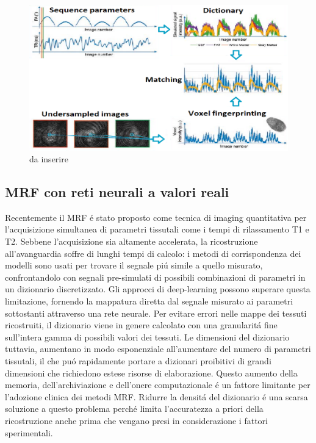 \documentclass[a4paper,10pt]{article}
\begin{document}
 \begin{figure}[h!]
  \centering
  \includegraphics[scale=0.3]{MRF.png}
  \caption{da inserire}
  \label{MRFpng}
 \end{figure}

 \subsection{MRF con reti neurali a valori reali}
 
 Recentemente il MRF \'e stato proposto come tecnica di imaging quantitativa per l'acquisizione simultanea di parametri tissutali come i tempi di rilassamento T1 e T2. Sebbene l'acquisizione sia altamente accelerata, la ricostruzione all'avanguardia soffre di lunghi tempi di calcolo: i metodi di corrispondenza dei modelli sono usati per trovare il segnale pi\'u simile a quello misurato, confrontandolo con segnali pre-simulati di possibili combinazioni di parametri in un dizionario discretizzato. Gli approcci di deep-learning possono superare questa limitazione, fornendo la mappatura diretta dal segnale misurato ai parametri sottostanti attraverso una rete neurale. Per evitare errori nelle mappe dei tessuti ricostruiti, il dizionario viene in genere calcolato con una granularit\'a fine sull'intera gamma di possibili valori dei tessuti. Le dimensioni del dizionario tuttavia, aumentano in modo esponenziale all'aumentare del numero di parametri tissutali, il che pu\'o rapidamente portare a dizionari proibitivi di grandi dimensioni che richiedono estese risorse di elaborazione. Questo aumento della memoria, dell'archiviazione e dell'onere computazionale \'e un fattore limitante per l'adozione clinica dei metodi MRF. Ridurre la densit\'a del dizionario \'e una scarsa soluzione a questo problema perch\'e limita l'accuratezza a priori della ricostruzione anche prima che vengano presi in considerazione i fattori sperimentali. 
 
\end{document}
